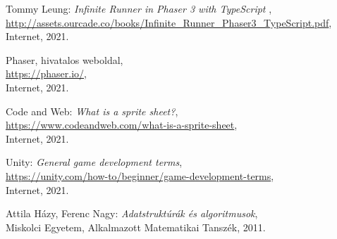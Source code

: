 \begin{thebibliography}{x}
	Tommy Leung: \emph{Infinite Runner in Phaser 3 with	TypeScript
}, \\
	\url{http://assets.ourcade.co/books/Infinite_Runner_Phaser3_TypeScript.pdf},
	Internet, 2021.
	
	Phaser, hivatalos weboldal, \\
	\url{https://phaser.io/}, \\
	Internet, 2021.
	
	Code and Web: \emph{What is a sprite sheet?}, \\
	\url{https://www.codeandweb.com/what-is-a-sprite-sheet}, \\
	Internet, 2021.
	
	Unity: \emph{General game development terms}, \\
	\url{https://unity.com/how-to/beginner/game-development-terms}, \\
	Internet, 2021.
	
	Attila Házy, Ferenc Nagy: \emph{Adatstruktúrák és algoritmusok}, \\
	Miskolci Egyetem, Alkalmazott Matematikai Tanszék, 2011.

\end{thebibliography}

